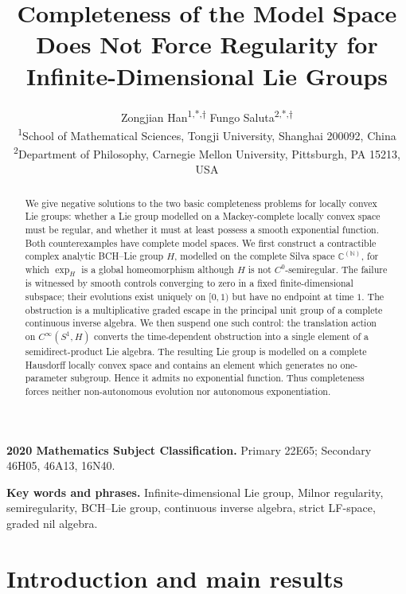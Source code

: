 \documentclass[11pt]{article}
\title{Completeness of the Model Space Does Not Force Regularity for Infinite-Dimensional Lie Groups}
\author{%
Zongjian Han\textsuperscript{1,*,$\dagger$}
\quad
Fungo Saluta\textsuperscript{2,*,$\dagger$}\\[0.65em]
\small\textsuperscript{1}School of Mathematical Sciences, Tongji University,
Shanghai 200092, China\\
\small\textsuperscript{2}Department of Philosophy, Carnegie Mellon University,
Pittsburgh, PA 15213, USA
}
\date{}
\theoremstyle{remark}
\begin{document}
\maketitle

\begingroup
\renewcommand{\thefootnote}{\fnsymbol{footnote}}
\endgroup

\begin{abstract}
We give negative solutions to the two basic completeness problems for locally
convex Lie groups: whether a Lie group modelled on a Mackey-complete locally
convex space must be regular, and whether it must at least possess a smooth
exponential function.  Both counterexamples have complete model spaces.  We
first construct a contractible complex analytic BCH--Lie group $H$, modelled
on the complete Silva space $\mathbb C^{(\mathbb N)}$, for which $\exp_H$ is a
global homeomorphism although $H$ is not $C^0$-semiregular.  The failure is
witnessed by smooth controls converging to zero in a fixed finite-dimensional
subspace; their evolutions exist uniquely on $[0,1)$ but have no endpoint at
time $1$.  The obstruction is a multiplicative graded escape in the principal
unit group of a complete continuous inverse algebra.  We then suspend one
such control: the translation action on $C^\infty(S^1,H)$ converts the
time-dependent obstruction into a single element of a semidirect-product Lie
algebra.  The resulting Lie group is modelled on a complete Hausdorff locally
convex space and contains an element which generates no one-parameter
subgroup.  Hence it admits no exponential function.  Thus completeness forces
neither non-autonomous evolution nor autonomous exponentiation.
\end{abstract}

\medskip
\noindent\textbf{2020 Mathematics Subject Classification.}
Primary 22E65; Secondary 46H05, 46A13, 16N40.

\smallskip
\noindent\textbf{Key words and phrases.}
Infinite-dimensional Lie group, Milnor regularity, semiregularity, BCH--Lie
group, continuous inverse algebra, strict LF-space, graded nil algebra.

\section{Introduction and main results}
\end{document}
